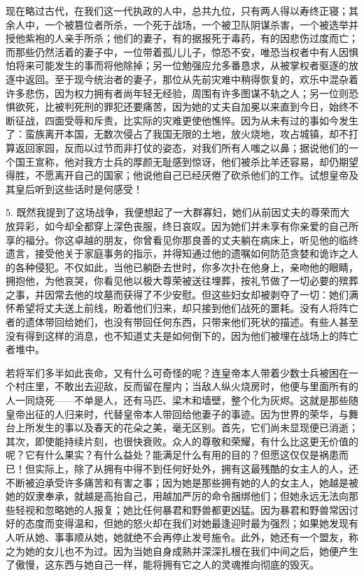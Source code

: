 现在略过古代，在我们这一代执政的人中，总共九位，只有两人得以寿终正寝；其余人中，一个被篡位者所杀，一个死于战场，一个被卫队阴谋杀害，一个被选举并授他紫袍的人亲手所杀；他们的妻子，有的据报死于毒药，有的因悲伤过度而亡；而那些仍然活着的妻子中，一位带着孤儿儿子，惊恐不安，唯恐当权者中有人因惧怕将来可能发生的事而将他除掉；另一位勉强应允多番恳求，从被掌权者驱逐的放逐中返回。至于现今统治者的妻子，那位从先前灾难中稍得恢复的，欢乐中混杂着许多悲伤，因为权力拥有者尚年轻无经验，周围有许多图谋不轨之人；另一位则恐惧欲死，比被判死刑的罪犯还要痛苦，因为她的丈夫自加冕以来直到今日，始终不断征战，四面受辱和斥责，比实际的灾难更使他憔悴。因为从未有过的事如今发生了：蛮族离开本国，无数次侵占了我国无限的土地，放火烧地，攻占城镇，却不打算返回家园，反而以过节而非打仗的姿态，对我们所有人嗤之以鼻；据说他们的一个国王宣称，他对我方士兵的厚颜无耻感到惊讶，他们被杀比羊还容易，却仍期望得胜，不愿离开自己的国家；他说他自己已经厌倦了砍杀他们的工作。试想皇帝及其皇后听到这些话时是何感受！\par

5. 既然我提到了这场战争，我便想起了一大群寡妇，她们从前因丈夫的尊荣而大放异彩，如今却全都穿上深色丧服，终日哀叹。因为她们并未享有你亲爱的自己所享的福分。你这卓越的朋友，你曾看见你那良善的丈夫躺在病床上，听见他的临终遗言，接受他关于家庭事务的指示，并得知通过他的遗嘱如何防范贪婪和诡诈之人的各种侵犯。不仅如此，当他已躺卧去世时，你多次扑在他身上，亲吻他的眼睛，拥抱他，为他哀哭，你看见他以极大尊荣被送往埋葬，按礼节做了一切必要的殡葬之事，并因常去他的坟墓而获得了不少安慰。但这些妇女却被剥夺了一切：她们满怀希望将丈夫送上前线，盼着他们归来，却只接到他们战死的噩耗。没有人将阵亡者的遗体带回给她们，也没有带回任何东西，只带来他们死状的描述。有些人甚至没有得到这样的消息，也不知道丈夫是如何倒下的，因为他们被埋在战场上的阵亡者堆中。\par

若将军们多半如此丧命，又有什么可奇怪的呢？连皇帝本人带着少数士兵被困在一个村庄里，不敢出去迎敌，反而留在屋内；当敌人纵火烧房时，他便与里面所有的人一同烧死——不单是人，还有马匹、梁木和墙壁，整个化为灰烬。这就是那些随皇帝出征的人归来时，代替皇帝本人带回给他妻子的事迹。因为世界的荣华，与舞台上所发生的事以及春天的花朵之美，毫无区别。首先，它们尚未显现便已消逝；其次，即使能持续片刻，也很快衰败。众人的尊敬和荣耀，有什么比这更无价值的呢？它有什么果实？有什么益处？能满足什么有用的目的？但愿这仅仅是祸患而已！但实际上，除了从拥有中得不到任何好处外，拥有这最残酷的女主人的人，还不断被迫承受许多痛苦和有害之事；因为她是那些拥有她的人的女主人，她越是被她的奴隶奉承，就越是高抬自己，用越加严厉的命令捆绑他们；但她永远无法向那些轻视和忽略她的人报复；她比任何暴君和野兽都更凶猛。因为暴君和野兽常因讨好的态度而变得温和，但她的怒火却在我们对她最逢迎时最为强烈；如果她发现有人听从她、事事顺从她，她就绝不会再停止发号施令。此外，她还有一个盟友，称之为她的女儿也不为过。因为当她自身成熟并深深扎根在我们中间之后，她便产生了傲慢，这东西与她自己一样，能将拥有它之人的灵魂推向彻底的毁灭。\par

